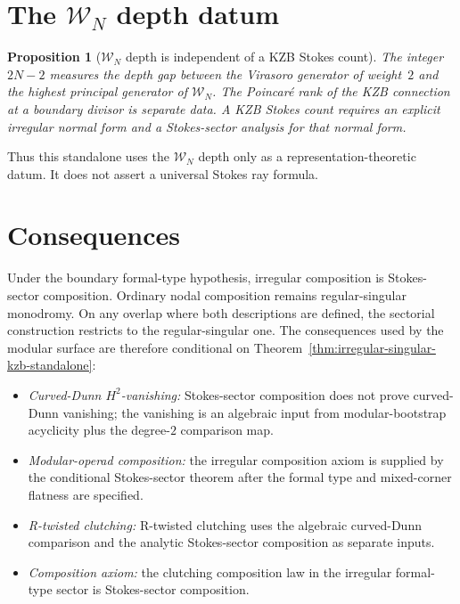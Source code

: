 \documentclass[11pt]{amsart}
\newtheorem{proposition}[theorem]{Proposition}
\theoremstyle{definition}
\theoremstyle{remark}
\begin{document}
\section{The $\mathcal{W}_N$ depth datum}

\begin{proposition}[$\mathcal{W}_N$ depth is independent of a KZB Stokes count]
\label{prop:wn-stokes-count}
The integer $2N-2$ measures the depth gap between the Virasoro
generator of weight~$2$ and the highest principal generator of
$\mathcal{W}_N$.  The Poincar\'e rank of the KZB connection at a
boundary divisor is separate data.  A KZB Stokes count requires an
explicit irregular normal form and a Stokes-sector analysis for that
normal form.
\end{proposition}

Thus this standalone uses the $\mathcal{W}_N$ depth only as a
representation-theoretic datum.  It does not assert a universal Stokes
ray formula.

\section{Consequences}

Under the boundary formal-type hypothesis, irregular composition is
Stokes-sector composition.  Ordinary nodal composition remains
regular-singular monodromy.  On any overlap where both descriptions
are defined, the sectorial construction restricts to the
regular-singular one.  The consequences used by the
modular surface are therefore conditional on
Theorem~\ref{thm:irregular-singular-kzb-standalone}:
\begin{itemize}[nosep]
\item \emph{Curved-Dunn \(H^2\)-vanishing:} Stokes-sector composition
does not prove curved-Dunn vanishing; the vanishing is an algebraic
input from modular-bootstrap acyclicity plus the degree-\(2\)
comparison map.
\item \emph{Modular-operad composition:} the irregular composition
axiom is supplied by the conditional Stokes-sector theorem after the
formal type and mixed-corner flatness are specified.
\item \emph{R-twisted clutching:} R-twisted clutching uses the
algebraic curved-Dunn comparison and the analytic Stokes-sector
composition as separate inputs.
\item \emph{Composition axiom:} the clutching composition law in the
irregular formal-type sector is Stokes-sector composition.
\end{itemize}
\end{document}
